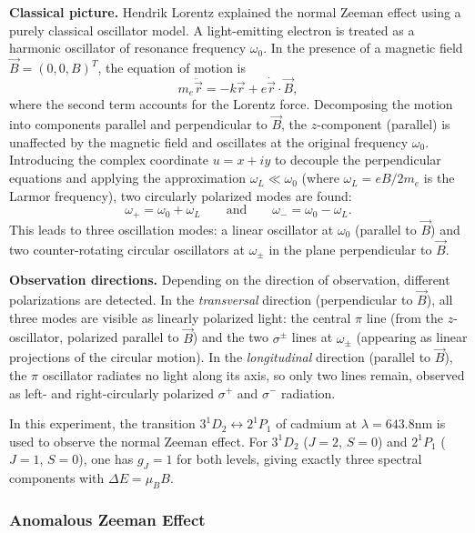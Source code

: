 \documentclass{article}
\begin{document}
\textbf{Classical picture.} Hendrik Lorentz explained the normal Zeeman effect using a purely classical oscillator model. A light-emitting electron is treated as a harmonic oscillator of resonance frequency $\omega_0$. In the presence of a magnetic field $\vec{B} = (0, 0, B)^T$, the equation of motion is
\begin{equation}
    m_e\ddot{\vec{r}} = -k\vec{r} + e\dot{\vec{r}} \cdot \vec{B},
\end{equation}
where the second term accounts for the Lorentz force. Decomposing the motion into components parallel and perpendicular to $\vec{B}$, the $z$-component (parallel) is unaffected by the magnetic field and oscillates at the original frequency $\omega_0$. Introducing the complex coordinate $u = x + iy$ to decouple the perpendicular equations and applying the approximation $\omega_L \ll \omega_0$ (where $\omega_L = eB/2m_e$ is the Larmor frequency), two circularly polarized modes are found:
\begin{equation}
    \omega_+ = \omega_0 + \omega_L \qquad \text{and} \qquad \omega_- = \omega_0 - \omega_L.
\end{equation}
This leads to three oscillation modes: a linear oscillator at $\omega_0$ (parallel to $\vec{B}$) and two counter-rotating circular oscillators at $\omega_\pm$ in the plane perpendicular to $\vec{B}$.

\textbf{Observation directions.} Depending on the direction of observation, different polarizations are detected. In the \textit{transversal} direction (perpendicular to $\vec{B}$), all three modes are visible as linearly polarized light: the central $\pi$ line (from the $z$-oscillator, polarized parallel to $\vec{B}$) and the two $\sigma^\pm$ lines at $\omega_\pm$ (appearing as linear projections of the circular motion). In the \textit{longitudinal} direction (parallel to $\vec{B}$), the $\pi$ oscillator radiates no light along its axis, so only two lines remain, observed as left- and right-circularly polarized $\sigma^+$ and $\sigma^-$ radiation.

In this experiment, the transition $3^1D_2 \leftrightarrow 2^1P_1$ of cadmium at $\lambda = 643.8$nm is used to observe the normal Zeeman effect. For $3^1D_2$ ($J = 2$, $S = 0$) and $2^1P_1$ ($J = 1$, $S = 0$), one has $g_J = 1$ for both levels, giving exactly three spectral components with $\Delta E = \mu_B B$.

\subsubsection{Anomalous Zeeman Effect}
\end{document}
